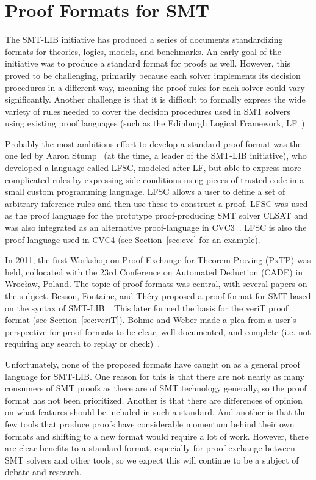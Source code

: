 \documentclass{llncs}
\begin{document}
\section{Proof Formats for SMT}
\label{sec:format}

The SMT-LIB initiative has produced a series of documents standardizing formats
for theories, logics, models, and benchmarks.  An early goal of the initiative
was to produce a standard format for proofs as well.  However, this proved to
be challenging, primarily because each solver implements its decision
procedures in a different way, meaning the proof rules for each solver could
vary significantly.  Another challenge is that it is difficult to formally
express the wide variety of rules needed to cover the decision procedures used
in SMT solvers using existing proof languages (such as the Edinburgh Logical
Framework, LF~\cite{HHP93}).

Probably the most ambitious effort to develop a standard proof format was the
one led by Aaron Stump~\cite{ORS09,SO08} (at the time, a leader of the SMT-LIB initiative), who
developed a language called LFSC, modeled after LF, but able to express more
complicated rules by expressing side-conditions using pieces of trusted
code in a small custom programming language.  LFSC allows a user to define a
set of arbitrary inference rules and then use these to construct a proof.  LFSC
was used as the proof language for the prototype proof-producing SMT
solver CLSAT and was also integrated as an alternative proof-language in
CVC3~\cite{SOR+13}.  LFSC is also the proof language used in CVC4 (see
Section~\ref{sec:cvc} for an example).

In 2011, the first Workshop on Proof Exchange for Theorem Proving (PxTP) was
held, collocated with the 23rd Conference on Automated Deduction (CADE) in
Wroc{\l}aw, Poland.  The topic of proof formats was central, with several
papers on the subject.  Besson, Fontaine, and Th\'ery proposed a proof format
for SMT based on the syntax of SMT-LIB~\cite{BFT11}.  This later formed the basis for
the veriT proof format (see Section~\ref{sec:veriT}).  B\"ohme and Weber made a
plea from a user's perspective for proof formats to be clear, well-documented,
and complete (i.e. not requiring any search to replay or check)~\cite{BW11}.

Unfortunately, none of the proposed formats have caught on as a general proof
language for SMT-LIB.  One reason for this is that there are not nearly as many
consumers of SMT proofs as there are of SMT technology generally, so the proof
format has not been prioritized.  Another is that there are differences of
opinion on what features should be included in such a standard.  And another is
that the few tools that produce proofs have considerable momentum behind their
own formats and shifting to a new format would require a lot of work.  However,
there are clear benefits to a standard format, especially for proof exchange
between SMT solvers and other tools, so we expect this will continue to be a
subject of debate and research.
\end{document}
